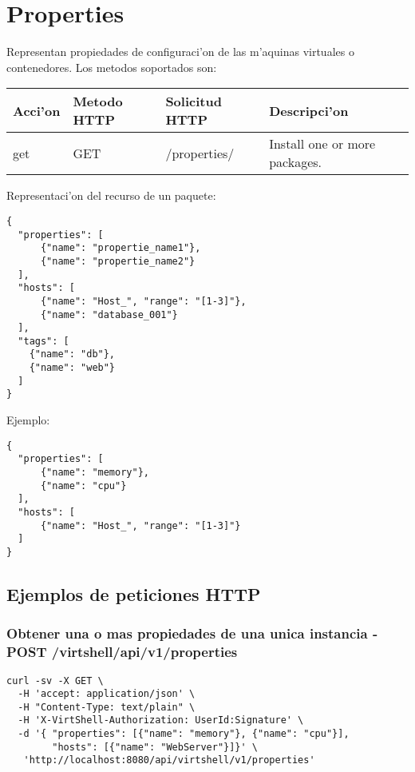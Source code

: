 \section{Properties}
Representan propiedades de configuraci'on de las m'aquinas virtuales o contenedores. Los metodos soportados son:

\begin{center}
 \begin{tabular}{| l | l | l | l |}
 \hline
  \rowcolor{blueapi}
  \textbf{Acci'on} & \textbf{Metodo HTTP} & \textbf{Solicitud HTTP} & \textbf{Descripci'on} \\ [0.5ex] 
  \hline\hline
  get & GET & /properties/ & Install one or more packages. \\ [1ex] 
  \hline
\end{tabular}
\end{center}

\vspace{1cm}
Representaci'on del recurso de un paquete:
\vspace{1cm}

\begin{lstlisting}[style=json]
{
  "properties": [
      {"name": "propertie_name1"},
      {"name": "propertie_name2"}
  ],
  "hosts": [ 
      {"name": "Host_", "range": "[1-3]"}, 
      {"name": "database_001"}
  ],
  "tags": [
    {"name": "db"},
    {"name": "web"}
  ]
}
\end{lstlisting}

Ejemplo:

\medskip
\begin{lstlisting}[style=json]
{
  "properties": [
      {"name": "memory"},
      {"name": "cpu"}
  ],
  "hosts": [ 
      {"name": "Host_", "range": "[1-3]"}
  ]
}
\end{lstlisting}

\subsection{Ejemplos de peticiones HTTP}

\subsubsection{Obtener una o mas propiedades de una unica instancia - POST /virtshell/api/v1/properties}

\begin{lstlisting}[style=json]
curl -sv -X GET \
  -H 'accept: application/json' \
  -H "Content-Type: text/plain" \
  -H 'X-VirtShell-Authorization: UserId:Signature' \
  -d '{ "properties": [{"name": "memory"}, {"name": "cpu"}],
        "hosts": [{"name": "WebServer"}]}' \
   'http://localhost:8080/api/virtshell/v1/properties'
\end{lstlisting}

